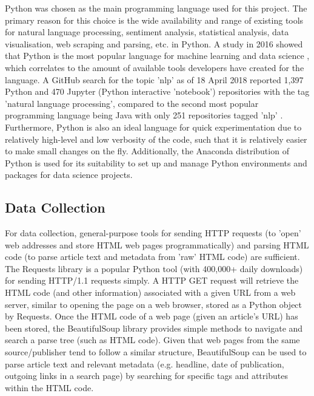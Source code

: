 \documentclass{report}
\begin{document}
Python was chosen as the main programming language used for this project.
The primary reason for this choice is the wide availability and range of existing tools for natural language processing, sentiment analysis, statistical analysis, data visualisation, web scraping and parsing, etc. in Python.
A study in 2016 showed that Python is the most popular language for machine learning and data science \cite{puget2016most}, which correlates to the amount of available tools developers have created for the language.
A GitHub search for the topic 'nlp' as of 18 April 2018 reported 1,397 Python and 470 Jupyter (Python interactive 'notebook') repositories with the tag 'natural language processing', compared to the second most popular programming language being Java with only 251 repositories tagged 'nlp' \cite{GitHubNLP}.
Furthermore, Python is also an ideal language for quick experimentation due to relatively high-level and low verbosity of the code, such that it is relatively easier to make small changes on the fly.
Additionally, the Anaconda distribution of Python \cite{Anaconda} is used for its suitability to set up and manage Python environments and packages for data science projects.

\subsection{Data Collection} \label{tc-data-collection}
For data collection, general-purpose tools for sending HTTP requests (to 'open' web addresses and store HTML web pages programmatically) and parsing HTML code (to parse article text and metadata from 'raw' HTML code) are sufficient. 
The Requests library \cite{Requests} is a popular Python tool (with 400,000+ daily downloads) for sending HTTP/1.1 requests simply.
A HTTP GET request will retrieve the HTML code (and other information) associated with a given URL from a web server, similar to opening the page on a web browser, stored as a Python object by Requests.
Once the HTML code of a web page (given an article's URL) has been stored, the BeautifulSoup library \cite{BeautifulSoup} provides simple methods to navigate and search a parse tree (such as HTML code).
Given that web pages from the same source/publisher tend to follow a similar structure, BeautifulSoup can be used to parse article text and relevant metadata (e.g. headline, date of publication, outgoing links in a search page) by searching for specific tags and attributes within the HTML code.
\end{document}
